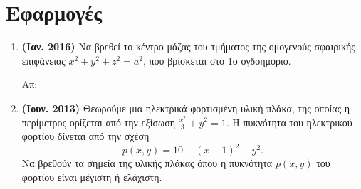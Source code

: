 \section*{Εφαρμογές}

\begin{enumerate}
  \item \textbf{(Ιαν. 2016)} Να βρεθεί το κέντρο μάζας του τμήματος της ομογενούς 
    σφαιρικής επιφάνειας $ x^{2}+y^{2}+z^{2}=a^{2} $, που βρίσκεται στο 1ο ογδοημόριο.

    \hfill Απ:  

  \item \textbf{(Ιουν. 2013)} Θεωρούμε μια ηλεκτρικά φορτισμένη υλική πλάκα, της οποίας 
    η περίμετρος ορίζεται από την εξίσωση $ \frac{x^{2}}{3} + y^{2} = 1 $. Η 
    πυκνότητα του ηλεκτρικού φορτίου δίνεται από την σχέση
    \[
      p(x,y) = 10 - (x-1)^{2}-y^{2}. 
    \]  
    Να βρεθούν τα σημεία της υλικής πλάκας όπου η πυκνότητα $ p(x,y) $ του φορτίου 
    είναι μέγιστη ή ελάχιστη.
\end{enumerate}




